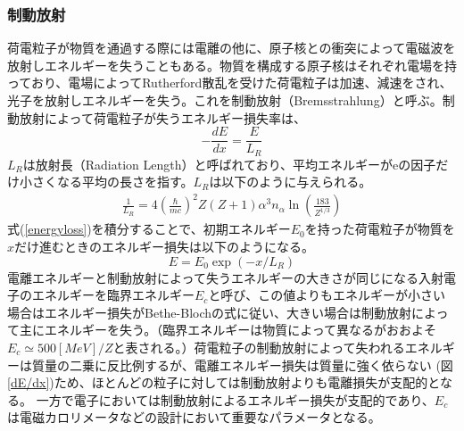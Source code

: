 \subsubsection{制動放射}
荷電粒子が物質を通過する際には電離の他に、原子核との衝突によって電磁波を放射しエネルギーを失うこともある。物質を構成する原子核はそれぞれ電場を持っており、電場によってRutherford散乱を受けた荷電粒子は加速、減速をされ、光子を放射しエネルギーを失う。これを制動放射（Bremsstrahlung）と呼ぶ。制動放射によって荷電粒子が失うエネルギー損失率は、
\begin{equation}
	\label{energyloss}
	- { \frac{dE}{dx} } = \frac{E}{L_R}
\end{equation}
$L_R$は放射長（Radiation Length）と呼ばれており、平均エネルギーがeの因子だけ小さくなる平均の長さを指す。$L_R$は以下のように与えられる。
\begin{align}
\frac{1}{L_R} = 4 {\left( \frac{\hbar}{mc} \right)}^2 Z (Z+1) {\alpha}^3 n_{\alpha} \ln(\frac{183}{Z^{1/3}})
\end{align}
式(\ref{energyloss})を積分することで、初期エネルギー$E_0$を持った荷電粒子が物質を$x$だけ進むときのエネルギー損失は以下のようになる。
\begin{equation}
E = E_0 \exp(-x/L_R)
\end{equation}
電離エネルギーと制動放射によって失うエネルギーの大きさが同じになる入射電子のエネルギーを臨界エネルギー$E_c$と呼び、この値よりもエネルギーが小さい場合はエネルギー損失がBethe-Blochの式に従い、大きい場合は制動放射によって主にエネルギーを失う。（臨界エネルギーは物質によって異なるがおおよそ$E_c \simeq 500[MeV] / Z$と表される。）荷電粒子の制動放射によって失われるエネルギーは質量の二乗に反比例するが、電離エネルギー損失は質量に強く依らない (図\ref{dE/dx})ため、ほとんどの粒子に対しては制動放射よりも電離損失が支配的となる。 一方で電子においては制動放射によるエネルギー損失が支配的であり、$E_c$は電磁カロリメータなどの設計において重要なパラメータとなる。
